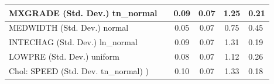 \begin{table}
\begin{center}
\begin{tabular}{|l|l|c|c|c|l|}
			\hline
			MXGRADE (Std. Dev.) tn_normal &  & 0.09 & 0.07 & 1.25 & 0.21 \\
			\hline
			MEDWIDTH (Std. Dev.) normal &  & 0.05 & 0.07 & 0.75 & 0.45 \\
			\hline
			INTECHAG (Std. Dev.) ln_normal &  & 0.09 & 0.07 & 1.31 & 0.19 \\
			\hline
			LOWPRE (Std. Dev.) uniform &  & 0.08 & 0.07 & 1.12 & 0.26 \\
			\hline
			 Chol: SPEED (Std. Dev. tn_normal) ) &  & 0.10 & 0.07 & 1.33 & 0.18 \\
			\hline
		\end{tabular}
	\end{center}
\end{table}